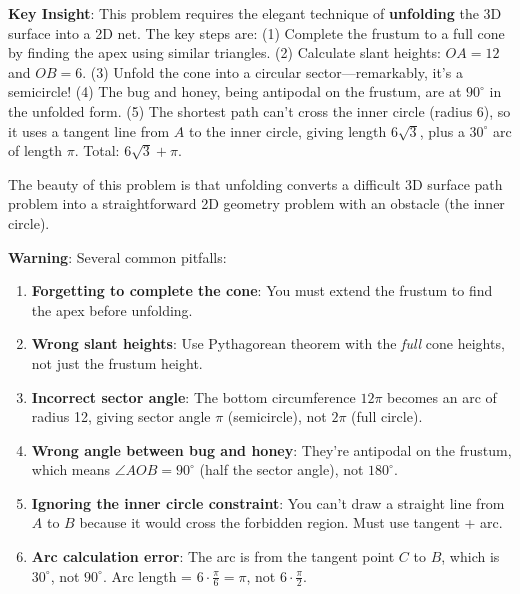 \documentclass[12pt]{article}
\begin{document}
\begin{keyinsightbox}
\textbf{Key Insight}: This problem requires the elegant technique of \textbf{unfolding} the 3D surface into a 2D net. The key steps are: (1) Complete the frustum to a full cone by finding the apex using similar triangles. (2) Calculate slant heights: $OA = 12$ and $OB = 6$. (3) Unfold the cone into a circular sector—remarkably, it's a semicircle! (4) The bug and honey, being antipodal on the frustum, are at $90^\circ$ in the unfolded form. (5) The shortest path can't cross the inner circle (radius 6), so it uses a tangent line from $A$ to the inner circle, giving length $6\sqrt{3}$, plus a $30^\circ$ arc of length $\pi$. Total: $6\sqrt{3} + \pi$.

The beauty of this problem is that unfolding converts a difficult 3D surface path problem into a straightforward 2D geometry problem with an obstacle (the inner circle).
\end{keyinsightbox}

\begin{warningbox}
\textbf{Warning}: Several common pitfalls:
\begin{enumerate}
    \item \textbf{Forgetting to complete the cone}: You must extend the frustum to find the apex before unfolding.
    \item \textbf{Wrong slant heights}: Use Pythagorean theorem with the \textit{full} cone heights, not just the frustum height.
    \item \textbf{Incorrect sector angle}: The bottom circumference $12\pi$ becomes an arc of radius 12, giving sector angle $\pi$ (semicircle), not $2\pi$ (full circle).
    \item \textbf{Wrong angle between bug and honey}: They're antipodal on the frustum, which means $\angle AOB = 90^\circ$ (half the sector angle), not $180^\circ$.
    \item \textbf{Ignoring the inner circle constraint}: You can't draw a straight line from $A$ to $B$ because it would cross the forbidden region. Must use tangent + arc.
    \item \textbf{Arc calculation error}: The arc is from the tangent point $C$ to $B$, which is $30^\circ$, not $90^\circ$. Arc length = $6 \cdot \frac{\pi}{6} = \pi$, not $6 \cdot \frac{\pi}{2}$.
\end{enumerate}
\end{warningbox}
\end{document}
